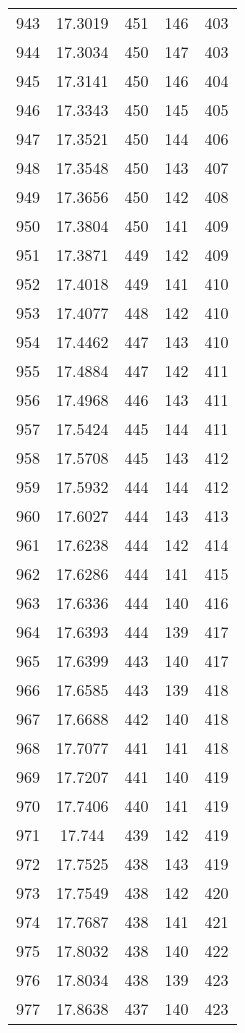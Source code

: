 \documentclass[12pt,a4paper]{article}
\begin{document}
\begin{tabular}{r|cccc}
	943 & 17.3019 & 451 & 146 & 403 \\
	944 & 17.3034 & 450 & 147 & 403 \\
	945 & 17.3141 & 450 & 146 & 404 \\
	946 & 17.3343 & 450 & 145 & 405 \\
	947 & 17.3521 & 450 & 144 & 406 \\
	948 & 17.3548 & 450 & 143 & 407 \\
	949 & 17.3656 & 450 & 142 & 408 \\
	950 & 17.3804 & 450 & 141 & 409 \\
	951 & 17.3871 & 449 & 142 & 409 \\
	952 & 17.4018 & 449 & 141 & 410 \\
	953 & 17.4077 & 448 & 142 & 410 \\
	954 & 17.4462 & 447 & 143 & 410 \\
	955 & 17.4884 & 447 & 142 & 411 \\
	956 & 17.4968 & 446 & 143 & 411 \\
	957 & 17.5424 & 445 & 144 & 411 \\
	958 & 17.5708 & 445 & 143 & 412 \\
	959 & 17.5932 & 444 & 144 & 412 \\
	960 & 17.6027 & 444 & 143 & 413 \\
	961 & 17.6238 & 444 & 142 & 414 \\
	962 & 17.6286 & 444 & 141 & 415 \\
	963 & 17.6336 & 444 & 140 & 416 \\
	964 & 17.6393 & 444 & 139 & 417 \\
	965 & 17.6399 & 443 & 140 & 417 \\
	966 & 17.6585 & 443 & 139 & 418 \\
	967 & 17.6688 & 442 & 140 & 418 \\
	968 & 17.7077 & 441 & 141 & 418 \\
	969 & 17.7207 & 441 & 140 & 419 \\
	970 & 17.7406 & 440 & 141 & 419 \\
	971 & 17.744 & 439 & 142 & 419 \\
	972 & 17.7525 & 438 & 143 & 419 \\
	973 & 17.7549 & 438 & 142 & 420 \\
	974 & 17.7687 & 438 & 141 & 421 \\
	975 & 17.8032 & 438 & 140 & 422 \\
	976 & 17.8034 & 438 & 139 & 423 \\
	977 & 17.8638 & 437 & 140 & 423 \\

\end{tabular}
\end{document}

